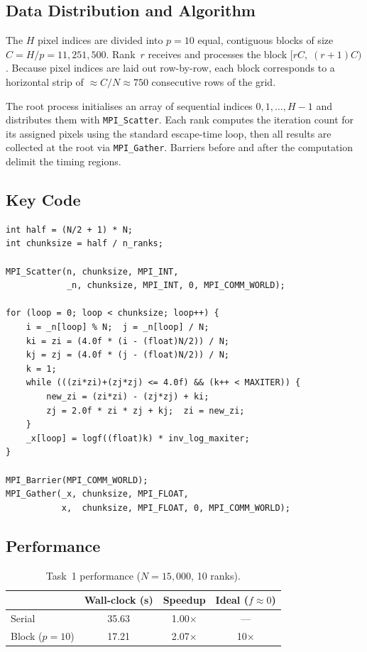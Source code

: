 \documentclass[11pt,a4paper]{article}
\begin{document}
\subsection{Data Distribution and Algorithm}

The $H$ pixel indices are divided into $p = 10$ equal, contiguous blocks of
size $C = H / p = 11{,}251{,}500$. Rank~$r$ receives and processes
the block $[rC,\; (r{+}1)C)$. Because pixel indices are laid out
row-by-row, each block corresponds to a horizontal strip of
$\approx C/N \approx 750$ consecutive rows of the grid.

The root process initialises an array of sequential indices $0, 1, \ldots,
H{-}1$ and distributes them with \texttt{MPI\_Scatter}. Each rank computes
the iteration count for its assigned pixels using the standard escape-time
loop, then all results are collected at the root via \texttt{MPI\_Gather}.
Barriers before and after the computation delimit the timing regions.

\subsection{Key Code}
\begin{lstlisting}
int half = (N/2 + 1) * N;
int chunksize = half / n_ranks;

MPI_Scatter(n, chunksize, MPI_INT,
            _n, chunksize, MPI_INT, 0, MPI_COMM_WORLD);

for (loop = 0; loop < chunksize; loop++) {
    i = _n[loop] % N;  j = _n[loop] / N;
    ki = zi = (4.0f * (i - (float)N/2)) / N;
    kj = zj = (4.0f * (j - (float)N/2)) / N;
    k = 1;
    while (((zi*zi)+(zj*zj) <= 4.0f) && (k++ < MAXITER)) {
        new_zi = (zi*zi) - (zj*zj) + ki;
        zj = 2.0f * zi * zj + kj;  zi = new_zi;
    }
    _x[loop] = logf((float)k) * inv_log_maxiter;
}

MPI_Barrier(MPI_COMM_WORLD);
MPI_Gather(_x, chunksize, MPI_FLOAT,
           x,  chunksize, MPI_FLOAT, 0, MPI_COMM_WORLD);
\end{lstlisting}

\subsection{Performance}

\begin{table}[h]\centering
\begin{tabular}{@{}lccc@{}}
\toprule
 & Wall-clock (s) & Speedup & Ideal ($f{\approx}0$) \\
\midrule
Serial      & 35.63 & 1.00$\times$ & --- \\
Block ($p{=}10$) & 17.21 & 2.07$\times$ & 10$\times$ \\
\bottomrule
\end{tabular}
\caption{Task~1 performance ($N=15{,}000$, 10 ranks).}
\label{tab:task1}
\end{table}
\end{document}
